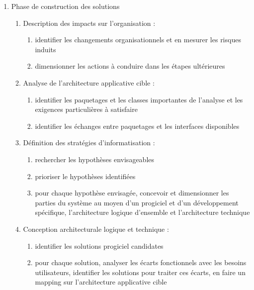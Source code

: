\begin{enumerate}
    \item Phase de construction des solutions

          \begin{enumerate}
            \item Description des impacts sur l'organisation : 
                \begin{enumerate}
                  \item identifier les changements organisationnels et en mesurer les risques induits
                  \item dimensionner les actions à conduire dans les étapes ultérieures
                \end{enumerate}
            \item Analyse de l'architecture applicative cible : 
                \begin{enumerate}
                  \item identifier les paquetages et les classes importantes de l'analyse et les exigences particulières à satisfaire 
                  \item identifier les échanges entre paquetages et les interfaces disponibles 
                \end{enumerate}
            \item Définition des stratégies d'informatisation : 
                \begin{enumerate}
                  \item rechercher les hypothèses envisageables 
                  \item prioriser le hypothèses identifiées
                  \item pour chaque hypothèse envisagée, concevoir et dimensionner les parties du système au moyen d'un progiciel et d'un développement spécifique, l'architecture logique d'ensemble et l'architecture technique
                \end{enumerate}
            \item Conception architecturale logique et technique : 
                \begin{enumerate}
                  \item identifier les solutions progiciel candidates 
                  \item pour chaque solution, analyser les écarts fonctionnels avec les besoins utilisateurs, identifier les solutions pour traiter ces écarts, en faire un mapping sur l'architecture applicative cible
                \end{enumerate}

\end{enumerate}
\end{enumerate}
